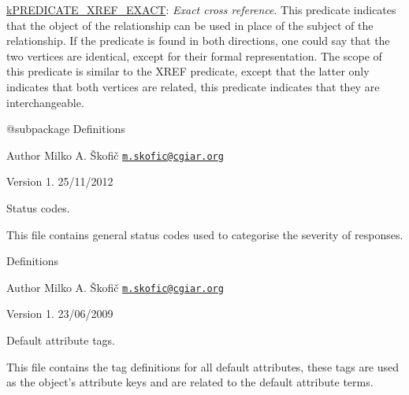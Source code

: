 \begin{DoxyItemize}
\item {\ttfamily \hyperlink{}{k\-P\-R\-E\-D\-I\-C\-A\-T\-E\-\_\-\-X\-R\-E\-F\-\_\-\-E\-X\-A\-C\-T}}\-: {\itshape Exact cross reference}. This predicate indicates that the object of the relationship can be used in place of the subject of the relationship. If the predicate is found in both directions, one could say that the two vertices are identical, except for their formal representation. The scope of this predicate is similar to the X\-R\-E\-F predicate, except that the latter only indicates that both vertices are related, this predicate indicates that they are interchangeable. 
\end{DoxyItemize}

\begin{DoxyVerb}    @subpackage     Definitions
\end{DoxyVerb}


\begin{DoxyAuthor}{Author}
Milko A. Škofič \href{mailto:m.skofic@cgiar.org}{\tt m.\-skofic@cgiar.\-org} 
\end{DoxyAuthor}
\begin{DoxyVersion}{Version}
1. 25/11/2012
\end{DoxyVersion}
Status codes.

This file contains general status codes used to categorise the severity of responses.

Definitions

\begin{DoxyAuthor}{Author}
Milko A. Škofič \href{mailto:m.skofic@cgiar.org}{\tt m.\-skofic@cgiar.\-org} 
\end{DoxyAuthor}
\begin{DoxyVersion}{Version}
1. 23/06/2009
\end{DoxyVersion}
Default attribute tags.

This file contains the tag definitions for all default attributes, these tags are used as the object's attribute keys and are related to the default attribute terms.


